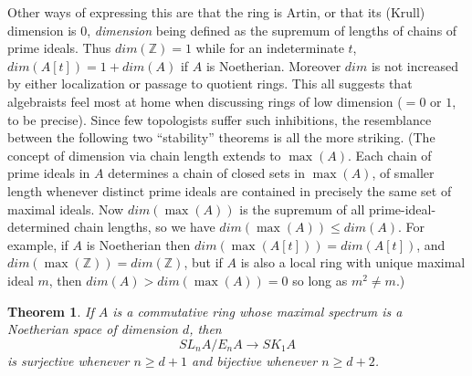 \documentclass[openany,leqno]{book}  %
\newcommand{\Z}{\mathbb{Z}}
\newtheorem{theorem}{Theorem}[chapter]
\begin{document}
Other ways of expressing this are that the ring is Artin, or that its (Krull) dimension is $0$, {\em dimension} being defined as the supremum of lengths of chains of prime ideals. Thus $dim(\Z)=1$ while for an indeterminate $t$, $dim(A[t])=1+dim(A)$ if $A$ is Noetherian. Moreover $dim$ is not increased by either localization or passage to quotient rings. This all suggests that algebraists feel most at home when discussing rings of low dimension ($=0$ or $1$, to be precise). Since few topologists suffer such inhibitions, the resemblance between the following two ``stability'' theorems is all the more striking. (The concept of dimension via chain length extends to $\max(A)$.
Each chain of prime ideals in $A$ determines a chain of closed sets in $\max(A)$, of smaller length whenever distinct prime ideals are contained in precisely the same set of maximal ideals. Now $dim(\max(A))$ is the supremum of all prime-ideal-determined chain lengths, so we have $dim(\max(A))\leqslant dim(A)$. For example, if $A$ is Noetherian then $dim(\max(A[t]))=dim(A[t])$, and $dim(\max(\Z))=dim(\Z)$, but if $A$ is also a local ring with unique maximal ideal $m$, then
$dim(A)>dim(\max(A))=0$ so long as $m^2\neq m$.)
\begin{theorem}
If $A$ is a commutative ring whose maximal spectrum is a Noetherian space of dimension $d$, then
\[SL_nA/E_nA\longrightarrow SK_1A\]
is surjective whenever $ n\geqslant d+1$ and bijective whenever $n\geqslant d+2$.
\end{theorem}
\end{document}
